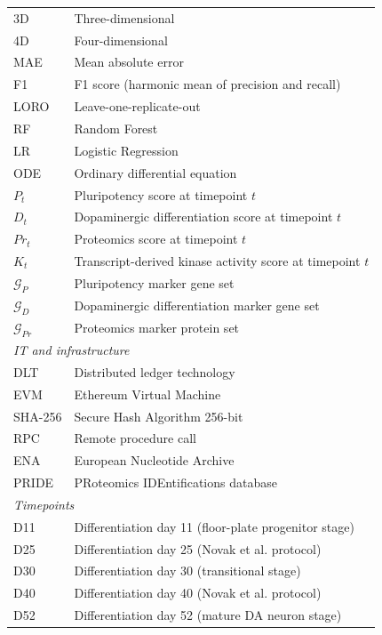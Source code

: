 \documentclass[5p,times,twocolumn]{elsarticle}
\newcommand{\rtag}[1]{}
\newcommand{\rev}[2]{\rtag{#1}#2}
\begin{document}
\begin{table}[!htbp]
{\begin{tabular}{p{2.7cm} p{6.2cm}}
      3D          & Three-dimensional \\
      4D          & Four-dimensional \\
      MAE         & Mean absolute error \\
      F1          & F1 score (harmonic mean of precision and recall) \\
      LORO        & Leave-one-replicate-out \\
      RF          & Random Forest \\
      LR          & Logistic Regression \\
      ODE         & Ordinary differential equation \\
      $P_t$       & Pluripotency score at timepoint $t$ \\
      $D_t$       & Dopaminergic differentiation score at timepoint $t$ \\
      $Pr_t$      & Proteomics score at timepoint $t$ \\
      $K_t$       & Transcript-derived kinase activity score at timepoint $t$ \\
      $\mathcal{G}_P$  & Pluripotency marker gene set \\
      $\mathcal{G}_D$  & Dopaminergic differentiation marker gene set \\
      $\mathcal{G}_{Pr}$ & Proteomics marker protein set \\
      \midrule
      \multicolumn{2}{l}{\textit{IT and infrastructure}} \\
      \midrule
      DLT         & Distributed ledger technology \\
      EVM         & Ethereum Virtual Machine \\
      SHA-256     & Secure Hash Algorithm 256-bit \\
      RPC         & Remote procedure call \\
      ENA         & European Nucleotide Archive \\
      PRIDE       & PRoteomics IDEntifications database \\
      \midrule
      \multicolumn{2}{l}{\textit{Timepoints}} \\
      \midrule
      D11         & Differentiation day 11 (\rev{AC}{floor-plate progenitor stage}) \\
      D25         & Differentiation day 25 (Novak et al. protocol) \\
      D30         & Differentiation day 30 (transitional stage) \\
      D40         & Differentiation day 40 (Novak et al. protocol) \\
      D52         & Differentiation day 52 (mature DA neuron stage) \\
      \bottomrule
    \end{tabular}}
\end{table}
\end{document}
